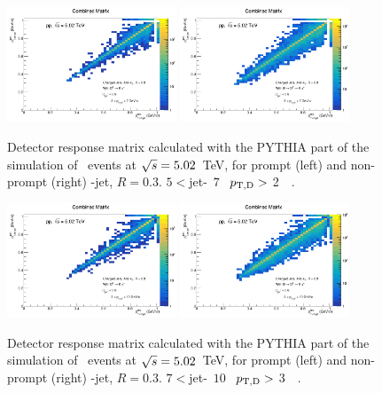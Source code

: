 \begin{figure}[bth]
\centering
\includegraphics[width=0.45\textwidth]{pp_2sig/response/R03/ProdMatrix_Jet5_7_Dpt2_7}
\includegraphics[width=0.45\textwidth]{pp_2sig/response/R03/ProdMatrixFD_Jet5_7_Dpt2_7}
\caption{Detector response matrix calculated with the PYTHIA part of the simulation of \pp\ events at $\sqrt{s}=5.02$~TeV, for prompt (left) and non-prompt (right) \Dzero-jet, $R=0.3$. $5<$jet-\pt\, $7$ \GeVc\, $p_{\mathrm{T,D}} > $ 2~\GeVc\ .}
\label{fig:fRMdet_pp_Dzero_5_7_R3}
\end{figure}

\begin{figure}[bth]
\centering
\includegraphics[width=0.45\textwidth]{pp_2sig/response/R03/ProdMatrix_Jet7_10_Dpt3_10}
\includegraphics[width=0.45\textwidth]{pp_2sig/response/R03/ProdMatrixFD_Jet7_10_Dpt3_10}
\caption{Detector response matrix calculated with the PYTHIA part of the simulation of \pp\ events at $\sqrt{s}=5.02$~TeV, for prompt (left) and non-prompt (right) \Dzero-jet, $R=0.3$. $7<$jet-\pt\, $10$ \GeVc\, $p_{\mathrm{T,D}} > $ 3~\GeVc\ .}
\label{fig:fRMdet_pp_Dzero_7_10_R3}
\end{figure}

